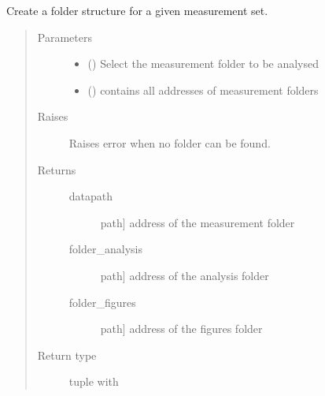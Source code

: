 \documentclass[letterpaper,10pt,english]{sphinxmanual}
\begin{document}
\begin{fulllineitems}
\label{\detokenize{tes:tes.folder_management.manage_folders}}
\sphinxAtStartPar
Create a folder structure for a given measurement set.
\begin{quote}\begin{description}
\item[{Parameters}] \leavevmode\begin{itemize}
\item {} 
\sphinxAtStartPar
{} () \textendash{} Select the measurement folder to be analysed

\item {} 
\sphinxAtStartPar
{} () \textendash{} contains all addresses of measurement folders

\end{itemize}

\item[{Raises}] \leavevmode
\sphinxAtStartPar
{} \textendash{} Raises error when no folder can be found.

\item[{Returns}] \leavevmode
\sphinxAtStartPar
\begin{description}
\item[{datapath}] \leavevmode{[}path{]}
\sphinxAtStartPar
address of the measurement folder

\item[{folder\_analysis}] \leavevmode{[}path{]}
\sphinxAtStartPar
address of the analysis folder

\item[{folder\_figures}] \leavevmode{[}path{]}
\sphinxAtStartPar
address of the figures folder

\end{description}


\item[{Return type}] \leavevmode
\sphinxAtStartPar
tuple with

\end{description}\end{quote}

\end{fulllineitems}
\end{document}
